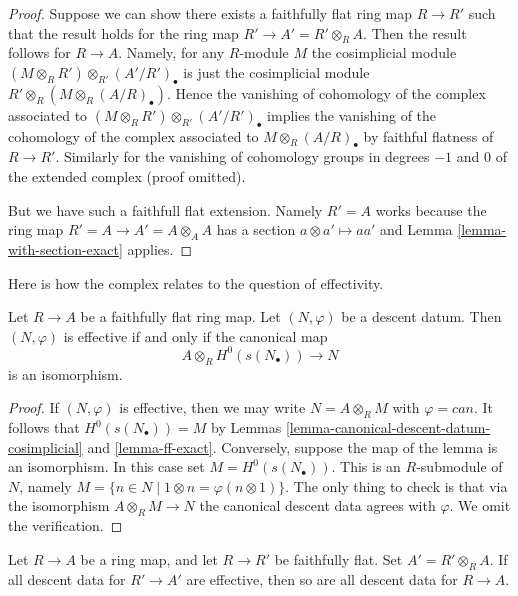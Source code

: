 \begin{proof}
Suppose we can show there exists a faithfully flat ring map
$R \to R'$ such that the result holds for the ring map
$R' \to A' = R' \otimes_R A$. Then the result follows for
$R \to A$. Namely, for any $R$-module $M$ the cosimplicial
module $(M \otimes_R R') \otimes_{R'} (A'/R')_\bullet$ is
just the cosimplicial module $R' \otimes_R (M \otimes_R (A/R)_\bullet)$.
Hence the vanishing of cohomology of the complex associated to
$(M \otimes_R R') \otimes_{R'} (A'/R')_\bullet$ implies the
vanishing of the cohomology of the complex associated to
$M \otimes_R (A/R)_\bullet$ by faithful flatness of $R \to R'$.
Similarly for the vanishing of cohomology groups in degrees
$-1$ and $0$ of the extended complex (proof omitted).

\medskip\noindent
But we have such a faithfull flat extension. Namely $R' = A$ works
because the ring map $R' = A \to A' = A \otimes_A A$ has a section
$a \otimes a' \mapsto aa'$ and
Lemma \ref{lemma-with-section-exact}
applies.
\end{proof}

\noindent
Here is how the complex relates to the question of effectivity.

\begin{lemma}
\label{lemma-recognize-effective}
Let $R \to A$ be a faithfully flat ring map.
Let $(N, \varphi)$ be a descent datum.
Then $(N, \varphi)$ is effective if and only if the canonical
map
$$
A \otimes_R H^0(s(N_\bullet)) \longrightarrow N
$$
is an isomorphism.
\end{lemma}

\begin{proof}
If $(N, \varphi)$ is effective, then we may write $N = A \otimes_R M$
with $\varphi = can$. It follows that $H^0(s(N_\bullet)) = M$ by
Lemmas \ref{lemma-canonical-descent-datum-cosimplicial}
and \ref{lemma-ff-exact}. Conversely, suppose the map of the lemma
is an isomorphism. In this case set $M = H^0(s(N_\bullet))$.
This is an $R$-submodule of $N$,
namely $M = \{n \in N \mid 1 \otimes n = \varphi(n \otimes 1)\}$.
The only thing to check is that via the isomorphism
$A \otimes_R M \to N$
the canonical descent data agrees with $\varphi$.
We omit the verification.
\end{proof}

\begin{lemma}
\label{lemma-descent-descends}
Let $R \to A$ be a ring map, and let $R \to R'$ be faithfully flat.
Set $A' = R' \otimes_R A$. If all descent data for $R' \to A'$ are
effective, then so are all descent data for $R \to A$.
\end{lemma}

